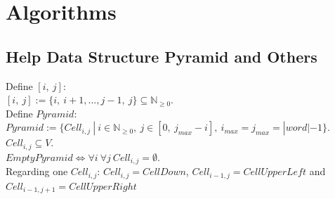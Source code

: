 
\section{Algorithms}\label{algorithms}

\subsection{Help Data Structure Pyramid and Others}

\noindent Define $[i,\ j]$: \\
$[i,\ j] := \{i,\ i+1,..., j-1,\ j\} \subseteq \mathbb{N}_{\geq 0}$.\\

\noindent Define $Pyramid$:\\
$Pyramid :=\{ Cell_{i,j}\ |\ i \in \mathbb{N}_{\geq 0},\  j \in [0,\ j_{max}-i],\ i_{max} = j_{max} = |word|-1\}$.\\
$Cell_{i,j} \subseteq V$.\\
$EmptyPyramid \Leftrightarrow \forall i\ \forall j\ Cell_{i,j}=\emptyset$.\\
Regarding one $Cell_{i,j}$: $Cell_{i,j} = CellDown$, $Cell_{i-1,j} = CellUpperLeft$ and $Cell_{i-1,j+1} = CellUpperRight$  \\

\newcommand{\boxpyramid}[1]{
\fontsize{5}{12}\selectfont{#1}
}

